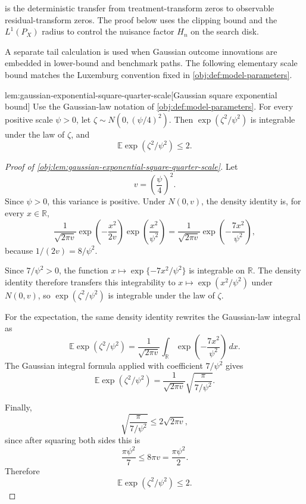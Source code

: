 \documentclass[11pt]{article}
\begin{document}
 is the deterministic transfer from treatment-transform zeros to observable residual-transform zeros. The proof below uses the clipping bound and the \(L^1(P_X)\) radius to control the nuisance factor \(H_n\) on the search disk.

A separate tail calculation is used when Gaussian outcome innovations are embedded in lower-bound and benchmark paths. The following elementary scale bound matches the Luxemburg convention fixed in \cref{obj:def:model-parameters}.

\begin{lemmav}{lem:gaussian-exponential-square-quarter-scale}[Gaussian square exponential bound]
Use the Gaussian-law notation of \cref{obj:def:model-parameters}. For every positive scale \(\psi>0\), let \(\zeta\sim N(0,(\psi/4)^2)\). Then \(\exp(\zeta^2/\psi^2)\) is integrable under the law of \(\zeta\), and
\[
\mathbb E\exp(\zeta^2/\psi^2)\le 2 .
\]
\end{lemmav}

\begin{proof}[Proof of \cref{obj:lem:gaussian-exponential-square-quarter-scale}]
Let
\[
v=\left(\frac{\psi}{4}\right)^2.
\]
Since \(\psi>0\), this variance is positive.  Under \(N(0,v)\), the density identity is, for every \(x\in\mathbb R\),
\[
\frac{1}{\sqrt{2\pi v}}\exp\!\left(-\frac{x^2}{2v}\right)
\exp\!\left(\frac{x^2}{\psi^2}\right)
=
\frac{1}{\sqrt{2\pi v}}
\exp\!\left(-\frac{7x^2}{\psi^2}\right),
\]
because \(1/(2v)=8/\psi^2\). %

Since \(7/\psi^2>0\), the function \(x\mapsto\exp\{-7x^2/\psi^2\}\) is integrable on \(\mathbb R\).  The density identity therefore transfers this integrability to \(x\mapsto\exp(x^2/\psi^2)\) under \(N(0,v)\), so \(\exp(\zeta^2/\psi^2)\) is integrable under the law of \(\zeta\). %

For the expectation, the same density identity rewrites the Gaussian-law integral as
\[
\mathbb E\exp(\zeta^2/\psi^2)
=
\frac{1}{\sqrt{2\pi v}}
\int_{\mathbb R}\exp\!\left(-\frac{7x^2}{\psi^2}\right)\,dx.
\]
The Gaussian integral formula applied with coefficient \(7/\psi^2\) gives
\[
\mathbb E\exp(\zeta^2/\psi^2)
=
\frac{1}{\sqrt{2\pi v}}
\sqrt{\frac{\pi}{7/\psi^2}}.
\]

Finally,
\[
\sqrt{\frac{\pi}{7/\psi^2}}
\le
2\sqrt{2\pi v},
\]
since after squaring both sides this is
\[
\frac{\pi\psi^2}{7}\le 8\pi v=\frac{\pi\psi^2}{2}.
\]
Therefore
\[
\mathbb E\exp(\zeta^2/\psi^2)\le2.
\]
\end{proof}
\end{document}
